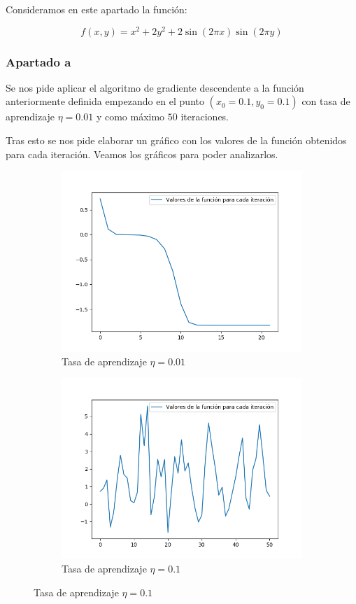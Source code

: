 \documentclass[12pt,a4paper]{article}
\begin{document}
Consideramos en este apartado la función:

$$f(x,y) = x^2 + 2y^2 + 2\sin{(2\pi x)}\sin{(2\pi y)}$$

\subsubsection{Apartado a}

Se nos pide aplicar el algoritmo de gradiente descendente a la función anteriormente definida empezando en el punto $(x_0 = 0.1, y_0 = 0.1)$ con tasa de aprendizaje $\eta = 0.01$ y como máximo $50$ iteraciones.

Tras esto se nos pide elaborar un gráfico con los valores de la función obtenidos para cada iteración. Veamos los gráficos para poder analizarlos.

\begin{figure}[H]
	\centering
	\begin{subfigure}{0.45\textwidth}
		\includegraphics[scale=0.5]{./Imagenes/3a1.png}
		\caption{Tasa de aprendizaje $\eta=0.01$}
		\label{3a1}
	\end{subfigure}
	\begin{subfigure}{0.45\textwidth}
		\includegraphics[scale=0.5]{./Imagenes/3a2.png}
		\caption{Tasa de aprendizaje $\eta=0.1$}
		\label{3a2}
	\end{subfigure}
\end{figure}
\end{document}
